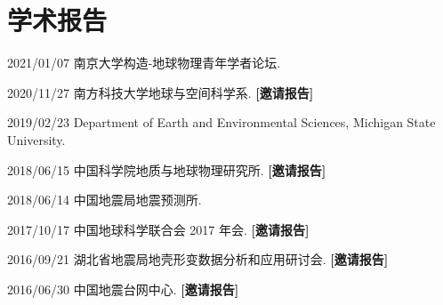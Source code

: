 \section{学术报告}

\newcommand{\Invited}{\textbf{[邀请报告]}}

\begin{etaremune}
\item 2021/01/07 南京大学构造-地球物理青年学者论坛.
\item 2020/11/27 南方科技大学地球与空间科学系. \Invited
\item 2019/02/23 Department of Earth and Environmental Sciences, Michigan State University.
\item 2018/06/15 中国科学院地质与地球物理研究所. \Invited
\item 2018/06/14 中国地震局地震预测所.
\item 2017/10/17 中国地球科学联合会 2017 年会. \Invited
\item 2016/09/21 湖北省地震局地壳形变数据分析和应用研讨会. \Invited
\item 2016/06/30 中国地震台网中心. \Invited
\end{etaremune}
